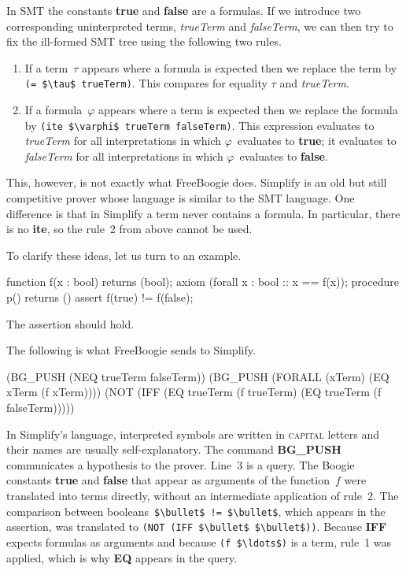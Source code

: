\documentclass{llncs}
\newcommand{\boogieCode}{\lstinline[style=boogie,basicstyle=\normalsize]}
\newcommand{\smtCode}{\lstinline[style=smt,basicstyle=\normalsize]}
\begin{document}
In SMT the constants \textbf{true} and \textbf{false} are a
formulas. If we introduce two corresponding uninterpreted terms,
\textit{trueTerm} and \textit{falseTerm}, we can then try to fix
the ill-formed SMT tree using the following two rules.
\begin{enumerate}
\item If a term~$\tau$ appears where a formula is expected then we 
  replace the term by \smtCode|(= $\tau$ trueTerm)|. This compares
  for equality $\tau$ and \textit{trueTerm}.
\item If a formula~$\varphi$ appears where a term is expected
  then we replace the formula by 
  \smtCode|(ite $\varphi$ trueTerm falseTerm)|.
  This expression evaluates to \textit{trueTerm} for all 
  interpretations in which $\varphi$~evaluates to \textbf{true};
  it evaluates to \textit{falseTerm} for all interpretations
  in which $\varphi$~evaluates to \textbf{false}.
\end{enumerate}
This, however, is not exactly what FreeBoogie does.
Simplify is an old but still competitive prover whose language is
similar to the SMT language. One difference is that in Simplify
a term never contains a formula. In particular, there is no
\textbf{ite}, so the rule~2 from above cannot be used.

To clarify these ideas, let us turn to an example.
\begin{boogie}
function f(x : bool) returns (bool);
axiom (forall x : bool :: x == f(x));
procedure p() returns () { assert f(true) != f(false); }
\end{boogie}
The assertion should hold. 

The following is what FreeBoogie sends to Simplify.
\begin{smt}
(BG_PUSH (NEQ trueTerm falseTerm))
(BG_PUSH (FORALL (xTerm) (EQ xTerm (f xTerm))))
(NOT (IFF (EQ trueTerm (f trueTerm) (EQ trueTerm (f falseTerm)))))
\end{smt}

In Simplify's language, interpreted symbols are written
in \textsc{capital} letters and their names are usually
self-explanatory. The command \textbf{BG\_PUSH} communicates a
hypothesis to the prover. Line~3 is a query. The Boogie constants
\textbf{true} and \textbf{false} that appear as arguments
of the function~$f$ were translated into terms directly,
without an intermediate application of rule~2. The comparison
between booleans~\boogieCode|$\bullet$ != $\bullet$|, which appears
in the assertion, was translated to \smtCode|(NOT (IFF $\bullet$ $\bullet$))|. 
Because \textbf{IFF} expects formulas as arguments and because
\smtCode|(f $\ldots$)| is a term, rule~1 was applied, which is
why \textbf{EQ} appears in the query.
\end{document}
